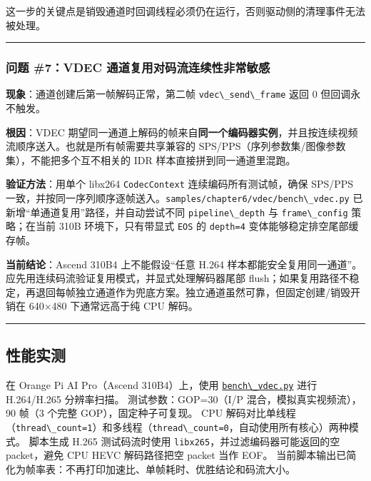 这一步的关键点是销毁通道时回调线程必须仍在运行，否则驱动侧的清理事件无法被处理。

\begin{center}\rule{0.5\linewidth}{0.5pt}\end{center}

\subsubsection{问题 \#7：VDEC
通道复用对码流连续性非常敏感}\label{src-book-chapter6-h75}

\textbf{现象}：通道创建后第一帧解码正常，第二帧
\passthrough{\lstinline!vdec\_send\_frame!} 返回 0 但回调永不触发。

\textbf{根因}：VDEC
期望同一通道上解码的帧来自\textbf{同一个编码器实例}，并且按连续视频流顺序送入。也就是所有帧需要共享兼容的
SPS/PPS（序列参数集/图像参数集），不能把多个互不相关的 IDR
样本直接拼到同一通道里混跑。

\textbf{验证方法}：用单个 libx264 \passthrough{\lstinline!CodecContext!}
连续编码所有测试帧，确保 SPS/PPS
一致，并按同一序列顺序逐帧送入。\passthrough{\lstinline!samples/chapter6/vdec/bench\_vdec.py!}
已新增``单通道复用''路径，并自动尝试不同
\passthrough{\lstinline!pipeline\_depth!} 与
\passthrough{\lstinline!frame\_config!} 策略；在当前 310B
环境下，只有带显式 \passthrough{\lstinline!EOS!} 的
\passthrough{\lstinline!depth=4!} 变体能够稳定排空尾部缓存帧。

\textbf{当前结论}：Ascend 310B4 上不能假设``任意 H.264
样本都能安全复用同一通道''。应先用连续码流验证复用模式，并显式处理解码器尾部
flush；如果复用路径不稳定，再退回每帧独立通道作为兜底方案。独立通道虽然可靠，但固定创建/销毁开销在
640×480 下通常远高于纯 CPU 解码。

\begin{center}\rule{0.5\linewidth}{0.5pt}\end{center}

\subsection{性能实测}\label{src-book-chapter6-h76}

在 Orange Pi AI Pro（Ascend 310B4）上，使用
\href{https://github.com/zhouxzh/Ascend310/blob/master/samples/chapter6/vdec/bench_vdec.py}{\passthrough{\lstinline!bench\_vdec.py!}}
进行 H.264/H.265 分辨率扫描。 测试参数：GOP=30（I/P
混合，模拟真实视频流），90 帧（3 个完整 GOP），固定种子可复现。 CPU
解码对比单线程（\passthrough{\lstinline!thread\_count=1!}）和多线程（\passthrough{\lstinline!thread\_count=0!}，自动使用所有核心）两种模式。
脚本生成 H.265 测试码流时使用
\passthrough{\lstinline!libx265!}，并过滤编码器可能返回的空 packet，避免
CPU HEVC 解码路径把空 packet 当作 EOF。
当前脚本输出已简化为帧率表：不再打印加速比、单帧耗时、优胜结论和码流大小。

